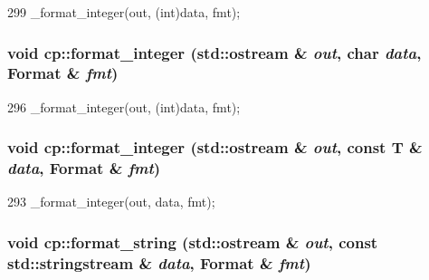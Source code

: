 \begin{DoxyCode}
299 { _format_integer(out, (int)data, fmt); }
\end{DoxyCode}
\hypertarget{namespacecp_abdef834401138d6ef18eef43c4f889b8}{
\subsubsection[{format\_\-integer}]{\setlength{\rightskip}{0pt plus 5cm}void cp::format\_\-integer (std::ostream \& {\em out}, \/  char {\em data}, \/  Format \& {\em fmt})}}
\label{namespacecp_abdef834401138d6ef18eef43c4f889b8}



\begin{DoxyCode}
296 { _format_integer(out, (int)data, fmt); }
\end{DoxyCode}
\hypertarget{namespacecp_a0ec2cefdf66b27770aa1282096ec027f}{
\subsubsection[{format\_\-integer}]{\setlength{\rightskip}{0pt plus 5cm}void cp::format\_\-integer (std::ostream \& {\em out}, \/  const T \& {\em data}, \/  Format \& {\em fmt})}}
\label{namespacecp_a0ec2cefdf66b27770aa1282096ec027f}



\begin{DoxyCode}
293 { _format_integer(out, data, fmt); }
\end{DoxyCode}
\hypertarget{namespacecp_a5faf6112477905a24772474cd93f884c}{
\subsubsection[{format\_\-string}]{\setlength{\rightskip}{0pt plus 5cm}void cp::format\_\-string (std::ostream \& {\em out}, \/  const std::stringstream \& {\em data}, \/  Format \& {\em fmt})}}
\label{namespacecp_a5faf6112477905a24772474cd93f884c}



